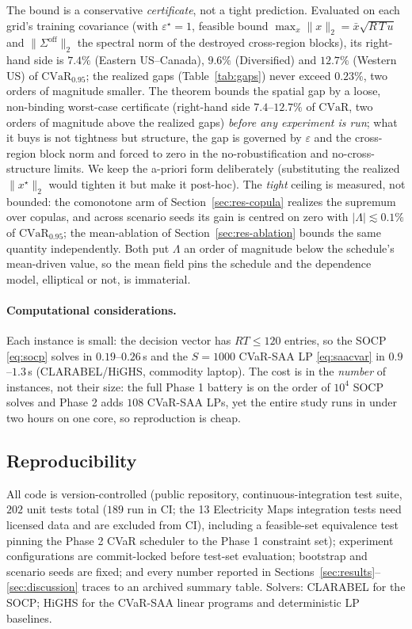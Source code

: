 \documentclass[10pt,twocolumn]{article}
\newcommand{\CVaR}{\mathrm{CVaR}}
\begin{document}
\noindent The bound is a conservative \emph{certificate}, not a tight prediction.
Evaluated on each grid's training covariance (with $\varepsilon^\star=1$, feasible
bound $\max_{x}\lVert x\rVert_2=\bar x\sqrt{R\,T\,u}$ and $\lVert\Sigma^{\mathrm{off}}
\rVert_2$ the spectral norm of the destroyed cross-region blocks), its right-hand
side is $7.4\%$ (Eastern US--Canada), $9.6\%$ (Diversified) and $12.7\%$ (Western
US) of $\CVaR_{0.95}$; the realized gaps (Table~\ref{tab:gaps}) never exceed
$0.23\%$, two orders of magnitude smaller. The theorem bounds the spatial gap by a
loose, non-binding worst-case certificate (right-hand side $7.4$--$12.7\%$ of $\CVaR$,
two orders of magnitude above the realized gaps) \emph{before any experiment is run};
what it buys is not tightness
but structure, the gap is governed by $\varepsilon$ and the cross-region block norm
and forced to zero in the no-robustification and no-cross-structure limits. We keep
the a-priori form deliberately (substituting the realized $\lVert x^\star\rVert_2$
would tighten it but make it post-hoc). The \emph{tight} ceiling is measured, not
bounded: the comonotone arm of Section~\ref{sec:res-copula} realizes the supremum
over copulas, and across scenario seeds its gain is centred on zero with
$|\Lambda|\lesssim0.1\%$ of $\CVaR_{0.95}$; the mean-ablation of
Section~\ref{sec:res-ablation} bounds the same quantity independently. Both put
$\Lambda$ an order of magnitude below the schedule's mean-driven value, so the mean
field pins the schedule and the dependence model, elliptical or not, is immaterial.

\paragraph{Computational considerations.} Each instance is small: the decision
vector has $RT\le120$ entries, so the SOCP \eqref{eq:socp} solves in $0.19$--$0.26$\,s
and the $S=1000$ CVaR-SAA LP \eqref{eq:saacvar} in $0.9$--$1.3$\,s (CLARABEL/HiGHS,
commodity laptop). The cost is in the \emph{number} of instances, not their size: the
full Phase 1 battery is on the order of $10^4$ SOCP solves and Phase 2 adds $108$
CVaR-SAA LPs, yet the entire study runs in under two hours on one core, so
reproduction is cheap.

\subsection{Reproducibility}\label{sec:repro}
All code is version-controlled (public repository, continuous-integration test
suite, $202$ unit tests total ($189$ run in CI; the 13 Electricity Maps integration tests need licensed data and are excluded from CI), including a feasible-set equivalence test pinning the
Phase 2 CVaR scheduler to the Phase 1 constraint set); experiment configurations
are commit-locked before test-set evaluation; bootstrap and scenario seeds are
fixed; and every number reported in
Sections~\ref{sec:results}--\ref{sec:discussion} traces to an archived summary
table. Solvers: CLARABEL for the SOCP; HiGHS for the CVaR-SAA linear programs
and deterministic LP baselines.
\end{document}
